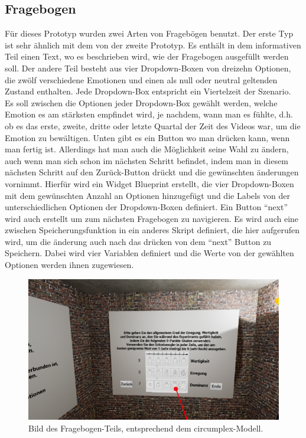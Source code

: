 \subsection{Fragebogen} \label{fragebogen-4}


F{\"u}r dieses Prototyp wurden zwei Arten von Frageb{\"o}gen benutzt. 
Der erste Typ ist sehr {\"a}hnlich mit dem von der zweite Prototyp. Es enth{\"a}lt in dem informativen Teil einen Text, wo es beschrieben wird, wie der Fragebogen ausgef{\"u}llt werden soll. Der andere Teil besteht aus vier Dropdown-Boxen von dreizehn Optionen, die zw{\"o}lf verschiedene Emotionen und einen als null oder neutral geltenden Zustand enthalten. Jede Dropdown-Box entspricht ein Viertelzeit der Szenario. Es soll zwischen die Optionen jeder Dropdown-Box gew{\"a}hlt werden, welche Emotion es am st{\"a}rksten empfindet wird, je nachdem, wann man es f{\"u}hlte, d.h. ob es das erste, zweite, dritte oder letzte Quartal der Zeit des Videos war, um die Emotion zu bew{\"a}ltigen. Unten gibt es ein Button wo man dr{\"u}cken kann, wenn man fertig ist. Allerdings hat man auch die M{\"o}glichkeit seine Wahl zu {\"a}ndern, auch wenn man sich schon im n{\"a}chsten Schritt befindet, indem man in diesem n{\"a}chsten Schritt auf den Zur{\"u}ck-Button dr{\"u}ckt und die gew{\"u}nschten {\"a}nderungen vornimmt. Hierf{\"u}r wird ein Widget Blueprint erstellt, die vier Dropdown-Boxen mit dem gew{\"u}nschten Anzahl an Optionen hinzugef{\"u}gt und die Labels von der unterschiedlichen Optionen der Dropdown-Boxen definiert. Ein Button ``next'' wird auch erstellt um zum n{\"a}chsten Fragebogen zu navigieren. Es wird auch eine zwischen Speicherungsfunktion in ein anderes Skript definiert, die hier aufgerufen wird, um die {\"a}nderung auch nach das dr{\"u}cken von dem ``next'' Button zu Speichern. Dabei wird vier Variablen definiert und die Werte von der gew{\"a}hlten Optionen werden ihnen zugewiesen. \\



\begin{figure}[H] \centering
\includegraphics[width=\textwidth]{Images/Fragebogen_3.png} 
\caption{ Bild des Fragebogen-Teils, entsprechend dem circumplex-Modell. } 
\label{fig:fragenbogen4} \end{figure}



